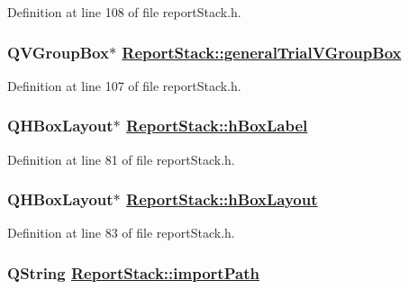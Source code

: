Definition at line 108 of file report\-Stack.h.\hypertarget{classReportStack_r33}{
\subsubsection[generalTrialVGroupBox]{\setlength{\rightskip}{0pt plus 5cm}QVGroup\-Box$\ast$ \hyperlink{classReportStack_r33}{Report\-Stack::general\-Trial\-VGroup\-Box}}}
\label{classReportStack_r33}


Definition at line 107 of file report\-Stack.h.\hypertarget{classReportStack_r10}{
\subsubsection[hBoxLabel]{\setlength{\rightskip}{0pt plus 5cm}QHBox\-Layout$\ast$ \hyperlink{classReportStack_r10}{Report\-Stack::h\-Box\-Label}}}
\label{classReportStack_r10}


Definition at line 81 of file report\-Stack.h.\hypertarget{classReportStack_r12}{
\subsubsection[hBoxLayout]{\setlength{\rightskip}{0pt plus 5cm}QHBox\-Layout$\ast$ \hyperlink{classReportStack_r12}{Report\-Stack::h\-Box\-Layout}}}
\label{classReportStack_r12}


Definition at line 83 of file report\-Stack.h.\hypertarget{classReportStack_r5}{
\subsubsection[importPath]{\setlength{\rightskip}{0pt plus 5cm}QString \hyperlink{classReportStack_r5}{Report\-Stack::import\-Path}}}
\label{classReportStack_r5}


